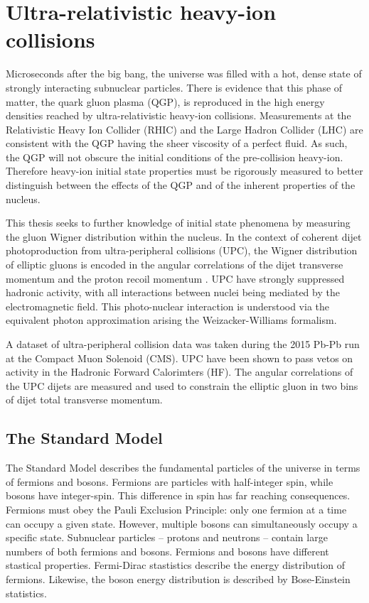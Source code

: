 \setlength\abovedisplayskip{0.4pt}
\setlength\belowdisplayskip{0.4pt}

\chapter{Ultra-relativistic heavy-ion collisions}

Microseconds after the big bang, the universe was filled with a hot, dense state of strongly interacting subnuclear particles. There is evidence that this phase of matter, the quark gluon plasma (QGP), is reproduced in the high energy densities reached by ultra-relativistic heavy-ion collisions. Measurements at the Relativistic Heavy Ion Collider (RHIC) and the Large Hadron Collider (LHC) are consistent with the QGP having the sheer viscosity of a perfect fluid. As such, the QGP will not obscure the initial conditions of the pre-collision heavy-ion. Therefore heavy-ion initial state properties must be rigorously measured to better distinguish between the effects of the QGP and of the inherent properties of the nucleus.

This thesis seeks to further knowledge of initial state phenomena by measuring the gluon Wigner distribution within the nucleus. In the context of coherent dijet photoproduction from ultra-peripheral collisions (UPC), the Wigner distribution of elliptic gluons is encoded in the angular correlations of the dijet transverse momentum and the proton recoil momentum \cite{Hagiwara:2016kam}. UPC have strongly suppressed hadronic activity, with all interactions between nuclei being mediated by the electromagnetic field. This photo-nuclear interaction is understood via the equivalent photon approximation arising the Weizacker-Williams formalism. 

A dataset of ultra-peripheral collision data was taken during the 2015 Pb-Pb run at the Compact Muon Solenoid (CMS). UPC have been shown to pass vetos on activity in the Hadronic Forward Calorimters (HF). The angular correlations of the UPC dijets are measured and used to constrain the elliptic gluon in two bins of dijet total transverse momentum. 

\section{The Standard Model}

The Standard Model describes the fundamental particles of the universe in terms of fermions and bosons. Fermions are particles with half-integer spin, while bosons have integer-spin. This difference in spin has far reaching consequences. Fermions must obey the Pauli Exclusion Principle: only one fermion at a time can occupy a given state. However, multiple bosons can simultaneously occupy a specific state. Subnuclear particles -- protons and neutrons -- contain large numbers of both fermions and bosons. Fermions and bosons have different stastical properties. Fermi-Dirac stastistics describe the energy distribution of fermions. Likewise, the boson energy distribution is described by Bose-Einstein statistics. 

